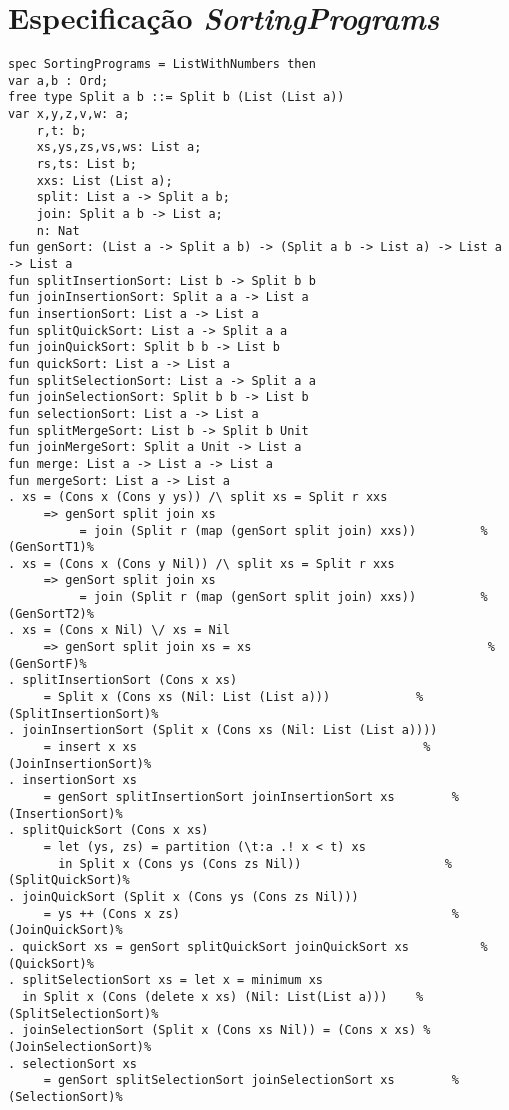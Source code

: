 \section{Especificação \textit{SortingPrograms}}
\label{appendix:strictSpec:sortingPrograms}
\begin{Verbatim}
spec SortingPrograms = ListWithNumbers then
var a,b : Ord;
free type Split a b ::= Split b (List (List a))
var x,y,z,v,w: a;
    r,t: b;
    xs,ys,zs,vs,ws: List a;
    rs,ts: List b;
    xxs: List (List a);
    split: List a -> Split a b;
    join: Split a b -> List a;
    n: Nat
fun genSort: (List a -> Split a b) -> (Split a b -> List a) -> List a -> List a
fun splitInsertionSort: List b -> Split b b
fun joinInsertionSort: Split a a -> List a
fun insertionSort: List a -> List a
fun splitQuickSort: List a -> Split a a
fun joinQuickSort: Split b b -> List b
fun quickSort: List a -> List a
fun splitSelectionSort: List a -> Split a a
fun joinSelectionSort: Split b b -> List b
fun selectionSort: List a -> List a
fun splitMergeSort: List b -> Split b Unit
fun joinMergeSort: Split a Unit -> List a
fun merge: List a -> List a -> List a
fun mergeSort: List a -> List a
. xs = (Cons x (Cons y ys)) /\ split xs = Split r xxs 
     => genSort split join xs
          = join (Split r (map (genSort split join) xxs))         %(GenSortT1)%
. xs = (Cons x (Cons y Nil)) /\ split xs = Split r xxs 
     => genSort split join xs 
          = join (Split r (map (genSort split join) xxs))         %(GenSortT2)%
. xs = (Cons x Nil) \/ xs = Nil
     => genSort split join xs = xs                                 %(GenSortF)%
. splitInsertionSort (Cons x xs) 
     = Split x (Cons xs (Nil: List (List a)))            %(SplitInsertionSort)%
. joinInsertionSort (Split x (Cons xs (Nil: List (List a)))) 
     = insert x xs                                        %(JoinInsertionSort)%
. insertionSort xs 
     = genSort splitInsertionSort joinInsertionSort xs        %(InsertionSort)%
. splitQuickSort (Cons x xs) 
     = let (ys, zs) = partition (\t:a .! x < t) xs
       in Split x (Cons ys (Cons zs Nil))                    %(SplitQuickSort)%
. joinQuickSort (Split x (Cons ys (Cons zs Nil))) 
     = ys ++ (Cons x zs)                                      %(JoinQuickSort)%
. quickSort xs = genSort splitQuickSort joinQuickSort xs          %(QuickSort)%
. splitSelectionSort xs = let x = minimum xs
  in Split x (Cons (delete x xs) (Nil: List(List a)))    %(SplitSelectionSort)%
. joinSelectionSort (Split x (Cons xs Nil)) = (Cons x xs) %(JoinSelectionSort)%
. selectionSort xs
     = genSort splitSelectionSort joinSelectionSort xs        %(SelectionSort)%

\end{Verbatim}
